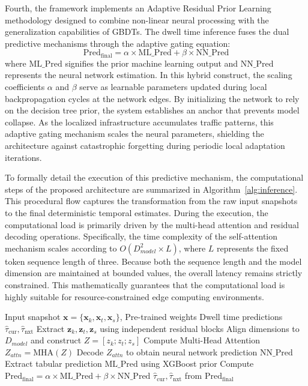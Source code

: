 \documentclass[journal]{IEEEtran}
\begin{document}
Fourth, the framework implements an Adaptive Residual Prior Learning methodology designed to combine non-linear neural processing with the generalization capabilities of GBDTs.
The dwell time inference fuses the dual predictive mechanisms through the adaptive gating equation:
\begin{equation}
\text{Pred}_{\text{final}} = \alpha \times \text{ML\_Pred} + \beta \times \text{NN\_Pred}
\end{equation}
where $\text{ML\_Pred}$ signifies the prior machine learning output and $\text{NN\_Pred}$ represents the neural network estimation.
In this hybrid construct, the scaling coefficients $\alpha$ and $\beta$ serve as learnable parameters updated during local backpropagation cycles at the network edges.
By initializing the network to rely on the decision tree prior, the system establishes an anchor that prevents model collapse.
As the localized infrastructure accumulates traffic patterns, this adaptive gating mechanism scales the neural parameters, shielding the architecture against catastrophic forgetting during periodic local adaptation iterations.

To formally detail the execution of this predictive mechanism, the computational steps of the proposed architecture are summarized in Algorithm~\ref{alg:inference}.
This procedural flow captures the transformation from the raw input snapshots to the final deterministic temporal estimates.
During the execution, the computational load is primarily driven by the multi-head attention and residual decoding operations.
Specifically, the time complexity of the self-attention mechanism scales according to $O(D_{model}^2 \times L)$, where $L$ represents the fixed token sequence length of three.
Because both the sequence length and the model dimension are maintained at bounded values, the overall latency remains strictly constrained.
This mathematically guarantees that the computational load is highly suitable for resource-constrained edge computing environments.

\begin{algorithm}[h]
\caption{H-ST-MBAN Inference Procedure}
\label{alg:inference}
\begin{algorithmic}[1]
\Require Input snapshot $\mathbf{x} = \{\mathbf{x}_k, \mathbf{x}_t, \mathbf{x}_s\}$, Pre-trained weights
\Ensure Dwell time predictions $\hat{\tau}_{\text{cur}}, \hat{\tau}_{\text{nxt}}$
\State Extract $\mathbf{z}_k, \mathbf{z}_t, \mathbf{z}_s$ using independent residual blocks
\State Align dimensions to $D_{model}$ and construct $Z = [z_k; z_t; z_s]$
\State Compute Multi-Head Attention $Z_{attn} = \text{MHA}(Z)$
\State Decode $Z_{attn}$ to obtain neural network prediction $\text{NN\_Pred}$
\State Extract tabular prediction $\text{ML\_Pred}$ using XGBoost prior
\State Compute $\text{Pred}_{\text{final}} = \alpha \times \text{ML\_Pred} + \beta \times \text{NN\_Pred}$
\State \Return $\hat{\tau}_{\text{cur}}, \hat{\tau}_{\text{nxt}}$ from $\text{Pred}_{\text{final}}$
\end{algorithmic}
\end{algorithm}
\end{document}
